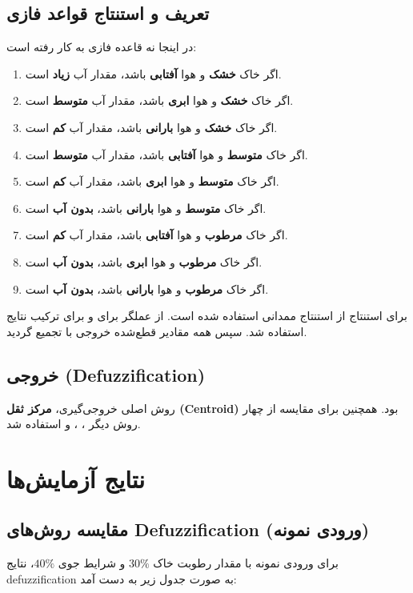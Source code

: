 \documentclass[12pt]{exam}
\begin{document}
	\subsection{تعریف و استنتاج قواعد فازی}
	در اینجا نه قاعده فازی به کار رفته است:
	\begin{enumerate}
		\item اگر خاک \textbf{خشک} و هوا \textbf{آفتابی} باشد، مقدار آب \textbf{زیاد} است.
		\item اگر خاک \textbf{خشک} و هوا \textbf{ابری} باشد، مقدار آب \textbf{متوسط} است.
		\item اگر خاک \textbf{خشک} و هوا \textbf{بارانی} باشد، مقدار آب \textbf{کم} است.
		\item اگر خاک \textbf{متوسط} و هوا \textbf{آفتابی} باشد، مقدار آب \textbf{متوسط} است.
		\item اگر خاک \textbf{متوسط} و هوا \textbf{ابری} باشد، مقدار آب \textbf{کم} است.
		\item اگر خاک \textbf{متوسط} و هوا \textbf{بارانی} باشد، \textbf{بدون آب} است.
		\item اگر خاک \textbf{مرطوب} و هوا \textbf{آفتابی} باشد، مقدار آب \textbf{کم} است.
		\item اگر خاک \textbf{مرطوب} و هوا \textbf{ابری} باشد، \textbf{بدون آب} است.
		\item اگر خاک \textbf{مرطوب} و هوا \textbf{بارانی} باشد، \textbf{بدون آب} است.
	\end{enumerate}
	
	برای استنتاج  از استنتاج ممدانی استفاده شده است. از عملگر  برای  و  برای ترکیب نتایج استفاده شد. سپس همه مقادیر قطع‌شده خروجی با  تجمیع گردید.
	
	\subsection{خروجی (Defuzzification)}
	روش اصلی خروجی‌گیری، \textbf{مرکز ثقل (Centroid)} بود. همچنین برای مقایسه از چهار روش دیگر ، ،  و  استفاده شد.
	
	\section{نتایج آزمایش‌ها}
	
	\subsection{مقایسه روش‌های Defuzzification (ورودی نمونه)}
	برای ورودی نمونه با مقدار رطوبت خاک \(30\%\) و شرایط جوی \(40\%\)، نتایج defuzzification به صورت جدول زیر به دست آمد:
	
\end{document}
